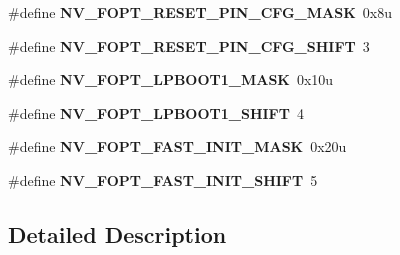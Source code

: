 \begin{DoxyCompactItemize}
\item 
\mbox{\label{group___n_v___register___masks_ga4b475b316319ff2d76d026ca0a9df50a}} 
\#define {\bfseries N\+V\+\_\+\+F\+O\+P\+T\+\_\+\+R\+E\+S\+E\+T\+\_\+\+P\+I\+N\+\_\+\+C\+F\+G\+\_\+\+M\+A\+SK}~0x8u
\item 
\mbox{\label{group___n_v___register___masks_ga9ea43f031c7695bdbf13c5168dabee6d}} 
\#define {\bfseries N\+V\+\_\+\+F\+O\+P\+T\+\_\+\+R\+E\+S\+E\+T\+\_\+\+P\+I\+N\+\_\+\+C\+F\+G\+\_\+\+S\+H\+I\+FT}~3
\item 
\mbox{\label{group___n_v___register___masks_ga0152e105ece0b627e9d8ffea2ec30cd9}} 
\#define {\bfseries N\+V\+\_\+\+F\+O\+P\+T\+\_\+\+L\+P\+B\+O\+O\+T1\+\_\+\+M\+A\+SK}~0x10u
\item 
\mbox{\label{group___n_v___register___masks_ga5acee776b6df2ef3408eb72e2caed133}} 
\#define {\bfseries N\+V\+\_\+\+F\+O\+P\+T\+\_\+\+L\+P\+B\+O\+O\+T1\+\_\+\+S\+H\+I\+FT}~4
\item 
\mbox{\label{group___n_v___register___masks_ga12400f522457526dbbe9e7e2549adecd}} 
\#define {\bfseries N\+V\+\_\+\+F\+O\+P\+T\+\_\+\+F\+A\+S\+T\+\_\+\+I\+N\+I\+T\+\_\+\+M\+A\+SK}~0x20u
\item 
\mbox{\label{group___n_v___register___masks_gae712cb476b0c59a5ba6ce468e3239a04}} 
\#define {\bfseries N\+V\+\_\+\+F\+O\+P\+T\+\_\+\+F\+A\+S\+T\+\_\+\+I\+N\+I\+T\+\_\+\+S\+H\+I\+FT}~5
\end{DoxyCompactItemize}


\subsection{Detailed Description}
